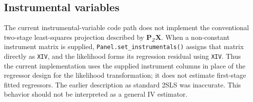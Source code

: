 \documentclass[12pt]{article}
\begin{document}
\subsection{Instrumental variables}\label{instrumental-variables}

The current instrumental-variable code path does not implement the conventional two-stage least-squares projection described by $\mathbf{P}_{Z}\mathbf{X}$. When a non-constant instrument matrix is supplied, \texttt{Panel.set\_instrumentals()} assigns that matrix directly as \texttt{XIV}, and the likelihood forms its regression residual using \texttt{XIV}. Thus the current implementation uses the supplied instrument columns in place of the regressor design for the likelihood transformation; it does not estimate first-stage fitted regressors. The earlier description as standard 2SLS was inaccurate. This behavior should not be interpreted as a general IV estimator.


\end{document}
